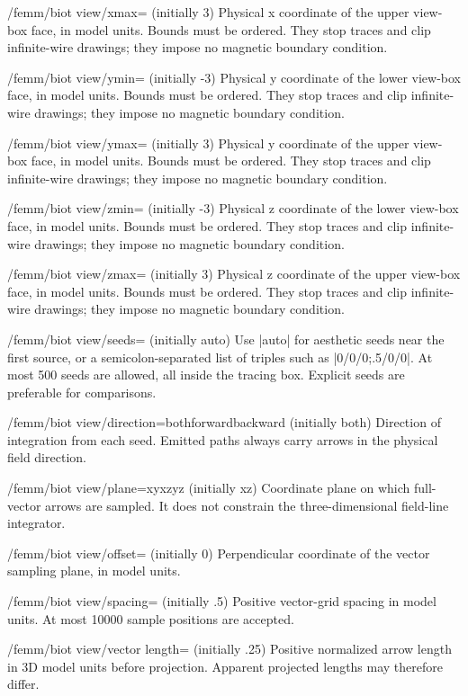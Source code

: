 \begin{key}{/femm/biot view/xmax= (initially 3)}
Physical x coordinate of the upper view-box face, in model units. Bounds must be ordered. They stop traces and clip infinite-wire drawings; they impose no magnetic boundary condition.
\end{key}
\begin{key}{/femm/biot view/ymin= (initially -3)}
Physical y coordinate of the lower view-box face, in model units. Bounds must be ordered. They stop traces and clip infinite-wire drawings; they impose no magnetic boundary condition.
\end{key}
\begin{key}{/femm/biot view/ymax= (initially 3)}
Physical y coordinate of the upper view-box face, in model units. Bounds must be ordered. They stop traces and clip infinite-wire drawings; they impose no magnetic boundary condition.
\end{key}
\begin{key}{/femm/biot view/zmin= (initially -3)}
Physical z coordinate of the lower view-box face, in model units. Bounds must be ordered. They stop traces and clip infinite-wire drawings; they impose no magnetic boundary condition.
\end{key}
\begin{key}{/femm/biot view/zmax= (initially 3)}
Physical z coordinate of the upper view-box face, in model units. Bounds must be ordered. They stop traces and clip infinite-wire drawings; they impose no magnetic boundary condition.
\end{key}
\begin{key}{/femm/biot view/seeds= (initially auto)}
Use |auto| for aesthetic seeds near the first source, or a semicolon-separated list of triples such as |0/0/0;.5/0/0|. At most 500 seeds are allowed, all inside the tracing box. Explicit seeds are preferable for comparisons.
\end{key}
\begin{key}{/femm/biot view/direction=both\textbar forward\textbar backward (initially both)}
Direction of integration from each seed. Emitted paths always carry arrows in the physical field direction.
\end{key}
\begin{key}{/femm/biot view/plane=xy\textbar xz\textbar yz (initially xz)}
Coordinate plane on which full-vector arrows are sampled. It does not constrain the three-dimensional field-line integrator.
\end{key}
\begin{key}{/femm/biot view/offset= (initially 0)}
Perpendicular coordinate of the vector sampling plane, in model units.
\end{key}
\begin{key}{/femm/biot view/spacing= (initially .5)}
Positive vector-grid spacing in model units. At most 10000 sample positions are accepted.
\end{key}
\begin{key}{/femm/biot view/vector length= (initially .25)}
Positive normalized arrow length in 3D model units before projection. Apparent projected lengths may therefore differ.
\end{key}
